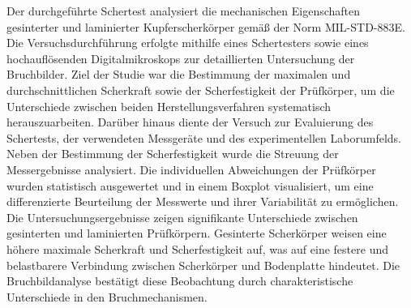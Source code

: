 Der durchgeführte Schertest analysiert die mechanischen Eigenschaften gesinterter und laminierter Kupferscherkörper gemäß der Norm MIL-STD-883E. Die Versuchsdurchführung erfolgte mithilfe eines Schertesters sowie eines hochauflösenden Digitalmikroskops zur detaillierten Untersuchung der Bruchbilder. Ziel der Studie war die Bestimmung der maximalen und durchschnittlichen Scherkraft sowie der Scherfestigkeit der Prüfkörper, um die Unterschiede zwischen beiden Herstellungsverfahren systematisch herauszuarbeiten. Darüber hinaus diente der Versuch zur Evaluierung des Schertests, der verwendeten Messgeräte und des experimentellen Laborumfelds.\\

Neben der Bestimmung der Scherfestigkeit wurde die Streuung der Messergebnisse analysiert. Die individuellen Abweichungen der Prüfkörper wurden statistisch ausgewertet und in einem Boxplot visualisiert, um eine differenzierte Beurteilung der Messwerte und ihrer Variabilität zu ermöglichen.\\

Die Untersuchungsergebnisse zeigen signifikante Unterschiede zwischen gesinterten und laminierten Prüfkörpern. Gesinterte Scherkörper weisen eine höhere maximale Scherkraft und Scherfestigkeit auf, was auf eine festere und belastbarere Verbindung zwischen Scherkörper und Bodenplatte hindeutet. Die Bruchbildanalyse bestätigt diese Beobachtung durch charakteristische Unterschiede in den Bruchmechanismen.